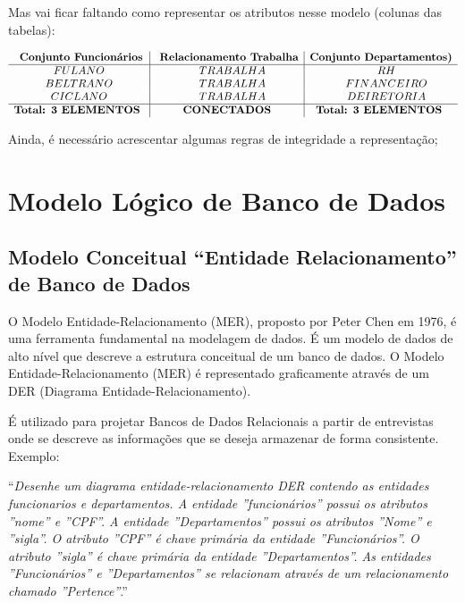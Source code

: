 \documentclass[
]{book}
\begin{document}
Mas vai ficar faltando como representar os atributos nesse modelo (colunas das tabelas):

\[
\begin{array}{c| c | c}
\textbf{ Conjunto Funcionários}    & \textbf{ Relacionamento Trabalha} & \textbf{Conjunto Departamentos)} \\ 
\hline 
FULANO                             &  \quad TRABALHA                   & \quad RH \\
BELTRANO                           &  \quad TRABALHA                   & \quad FINANCEIRO \\
CICLANO                            &  \quad TRABALHA                   & \quad DEIRETORIA \\
\hline
\textbf{Total: 3 ELEMENTOS }       & \textbf{ CONECTADOS }             & \textbf{Total: 3 ELEMENTOS }
\end{array}
\]

Ainda, é necessário acrescentar algumas regras de integridade a representação;

\section{Modelo Lógico de Banco de Dados}\label{modelo-luxf3gico-de-banco-de-dados}

\subsection{Modelo Conceitual ``Entidade Relacionamento'' de Banco de Dados}\label{modelo-conceitual-entidade-relacionamento-de-banco-de-dados}

O Modelo Entidade-Relacionamento (MER), proposto por Peter Chen em 1976, é uma ferramenta fundamental na modelagem de dados. É um modelo de dados de alto nível que descreve a estrutura conceitual de um banco de dados. O Modelo Entidade-Relacionamento (MER) é representado graficamente através de um DER (Diagrama Entidade-Relacionamento).

É utilizado para projetar Bancos de Dados Relacionais a partir de entrevistas onde se descreve as informações que se deseja armazenar de forma consistente. Exemplo:

``\emph{Desenhe um diagrama entidade-relacionamento DER contendo as entidades funcionarios e departamentos. A entidade ''funcionários'' possui os atributos ''nome'' e ''CPF''. A entidade ''Departamentos'' possui os atributos ''Nome'' e ''sigla''. O atributo ''CPF'' é chave primária da entidade ''Funcionários''. O atributo ''sigla'' é chave primária da entidade ''Departamentos''. As entidades ''Funcionários'' e ''Departamentos'' se relacionam através de um relacionamento chamado ''Pertence''}.''
\end{document}
